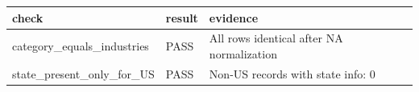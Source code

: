 \begin{tabular}{lll}
\toprule
check & result & evidence \\
\midrule
category\_equals\_industries & PASS & All rows identical after NA normalization \\
state\_present\_only\_for\_US & PASS & Non-US records with state info: 0 \\
\bottomrule
\end{tabular}
